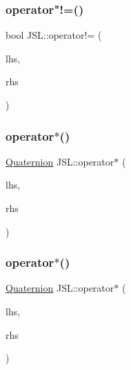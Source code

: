\subsubsection{\texorpdfstring{operator"!=()}{operator!=()}\hspace{0.1cm}{\footnotesize\ttfamily [2/2]}}
{\footnotesize\ttfamily bool J\+S\+L\+::operator!= (\begin{DoxyParamCaption}\item[{const \hyperlink{classJSL_1_1Matrix}{Matrix} \&}]{lhs,  }\item[{const \hyperlink{classJSL_1_1Matrix}{Matrix} \&}]{rhs }\end{DoxyParamCaption})\hspace{0.3cm}{\ttfamily [inline]}}

\mbox{\label{namespaceJSL_aff956bc38fdc0a19f41e202699560dff}} 
\subsubsection{\texorpdfstring{operator$\ast$()}{operator*()}\hspace{0.1cm}{\footnotesize\ttfamily [1/8]}}
{\footnotesize\ttfamily \hyperlink{classJSL_1_1Quaternion}{Quaternion} J\+S\+L\+::operator$\ast$ (\begin{DoxyParamCaption}\item[{const \hyperlink{classJSL_1_1Quaternion}{Quaternion} \&}]{lhs,  }\item[{const \hyperlink{classJSL_1_1Quaternion}{Quaternion} \&}]{rhs }\end{DoxyParamCaption})\hspace{0.3cm}{\ttfamily [inline]}}

\mbox{\label{namespaceJSL_a87842870ba7998a0ec521782b2d2f621}} 
\subsubsection{\texorpdfstring{operator$\ast$()}{operator*()}\hspace{0.1cm}{\footnotesize\ttfamily [2/8]}}
{\footnotesize\ttfamily \hyperlink{classJSL_1_1Quaternion}{Quaternion} J\+S\+L\+::operator$\ast$ (\begin{DoxyParamCaption}\item[{const \hyperlink{classJSL_1_1Matrix}{J\+S\+L\+::\+Matrix} \&}]{lhs,  }\item[{const \hyperlink{classJSL_1_1Quaternion}{Quaternion} \&}]{rhs }\end{DoxyParamCaption})\hspace{0.3cm}{\ttfamily [inline]}}

